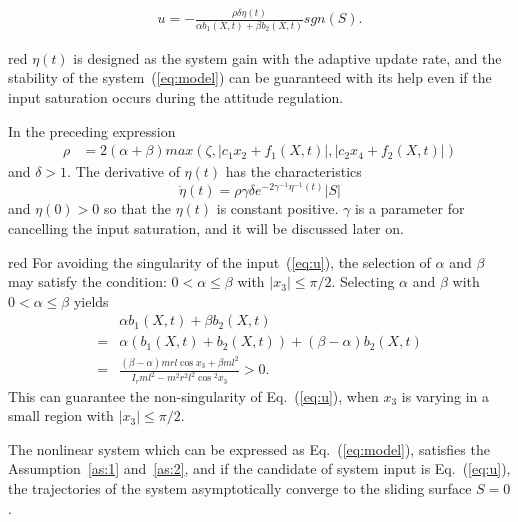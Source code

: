 \begin{align}
u = -\frac{\rho\delta\eta(t)}{\alpha b_1(X,t)+\beta b_2(X,t)}sgn(S)\label{eq:u}.
\end{align}\par
\begin{color}{red}
$\eta(t)$ is designed as the system gain with the adaptive update rate, and the stability of the system~(\ref{eq:model}) can be guaranteed with its help even if the input saturation occurs during the attitude regulation.
\end{color}
In the preceding expression
\begin{align}
\rho &= 2(\alpha+\beta)max(\zeta,\vert c_1x_2+f_1(X,t)\vert,\vert c_2x_4+f_2(X,t)\vert)
\end{align}
and $\delta>1$. The derivative of $\eta(t)$ has the characteristics $$\dot{{\eta}}(t) = \rho\gamma\delta e^{-2\gamma^{-1}{\eta}^{-1}(t)}\vert S\vert$$ and $\eta(0) > 0$ so that the $\eta(t)$ is constant positive. $\gamma$ is a parameter for cancelling the input saturation, and it will be discussed later on. \begin{color}{red}
For avoiding the singularity of the input~(\ref{eq:u}), the selection of $\alpha$ and $\beta$ may satisfy the condition: $0<\alpha\le\beta$ with $\vert x_3\vert\le\pi/2$.
    Selecting $\alpha$ and $\beta$ with $0<\alpha\le\beta$ yields
    \begin{align*}
    &\alpha b_1(X,t)+\beta b_2(X,t)\\
    =& \alpha(b_1(X,t)+b_2(X,t))+(\beta-\alpha)b_2(X,t)\\
    =&\frac{(\beta-\alpha)mrl\cos x_3 + \beta ml^2}{I_rml^2-m^2r^2l^2\cos{^2x_3}}>0.
    \end{align*}
    This can guarantee the non-singularity of Eq.~(\ref{eq:u}), when $x_3$ is varying in a small region with $\vert x_3\vert\le\pi/2$.
\end{color}
\begin{theorem}
The nonlinear system which can be expressed as Eq.~(\ref{eq:model}), satisfies the Assumption~\ref{as:1} and~\ref{as:2}, and if the candidate of system input is Eq.~(\ref{eq:u}), the trajectories of the system asymptotically converge to the sliding surface $S = 0$.
\end{theorem}
